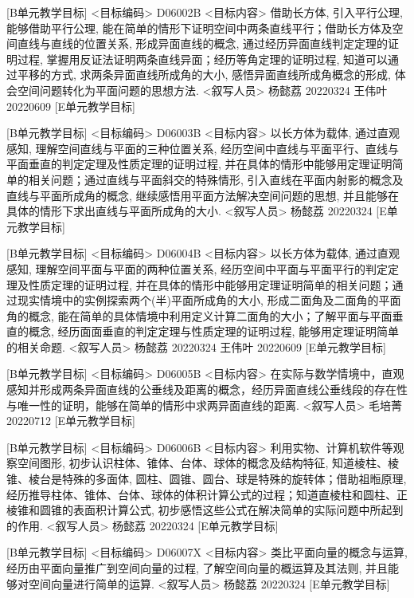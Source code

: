 \documentclass[10pt,a4paper]{article}
\begin{document}
[B单元教学目标]
<目标编码>
D06002B
<目标内容>
借助长方体, 引入平行公理, 能够借助平行公理, 能在简单的情形下证明空间中两条直线平行；借助长方体及空间直线与直线的位置关系, 形成异面直线的概念, 通过经历异面直线判定定理的证明过程, 掌握用反证法证明两条直线异面；经历等角定理的证明过程, 知道可以通过平移的方式, 求两条异面直线所成角的大小, 感悟异面直线所成角概念的形成, 体会空间问题转化为平面问题的思想方法. 
<叙写人员>
杨懿荔  20220324
王伟叶  20220609
[E单元教学目标]




[B单元教学目标]
<目标编码>
D06003B
<目标内容>
以长方体为载体, 通过直观感知, 理解空间直线与平面的三种位置关系, 经历空间中直线与平面平行、直线与平面垂直的判定定理及性质定理的证明过程, 并在具体的情形中能够用定理证明简单的相关问题；通过直线与平面斜交的特殊情形, 引入直线在平面内射影的概念及直线与平面所成角的概念, 继续感悟用平面方法解决空间问题的思想, 并且能够在具体的情形下求出直线与平面所成角的大小.
<叙写人员>
杨懿荔  20220324
[E单元教学目标]




[B单元教学目标]
<目标编码>
D06004B
<目标内容>
以长方体为载体, 通过直观感知, 理解空间平面与平面的两种位置关系, 经历空间中平面与平面平行的判定定理及性质定理的证明过程, 并在具体的情形中能够用定理证明简单的相关问题；通过现实情境中的实例探索两个(半)平面所成角的大小, 形成二面角及二面角的平面角的概念, 能在简单的具体情境中利用定义计算二面角的大小；了解平面与平面垂直的概念, 经历面面垂直的判定定理与性质定理的证明过程, 能够用定理证明简单的相关命题.
<叙写人员>
杨懿荔  20220324
王伟叶  20220609
[E单元教学目标]




[B单元教学目标]
<目标编码>
D06005B
<目标内容>
在实际与数学情境中，直观感知并形成两条异面直线的公垂线及距离的概念，经历异面直线公垂线段的存在性与唯一性的证明，能够在简单的情形中求两异面直线的距离.
<叙写人员>
毛培菁  20220712
[E单元教学目标]




[B单元教学目标]
<目标编码>
D06006B
<目标内容>
利用实物、计算机软件等观察空间图形, 初步认识柱体、锥体、台体、球体的概念及结构特征, 知道棱柱、棱锥、棱台是特殊的多面体, 圆柱、圆锥、圆台、球是特殊的旋转体；借助祖暅原理, 经历推导柱体、锥体、台体、球体的体积计算公式的过程；知道直棱柱和圆柱、正棱锥和圆锥的表面积计算公式, 初步感悟这些公式在解决简单的实际问题中所起到的作用.
<叙写人员>
杨懿荔  20220324
[E单元教学目标]




[B单元教学目标]
<目标编码>
D06007X
<目标内容>
类比平面向量的概念与运算, 经历由平面向量推广到空间向量的过程, 了解空间向量的概运算及其法则, 并且能够对空间向量进行简单的运算.
<叙写人员>
杨懿荔  20220324
[E单元教学目标]
\end{document}
